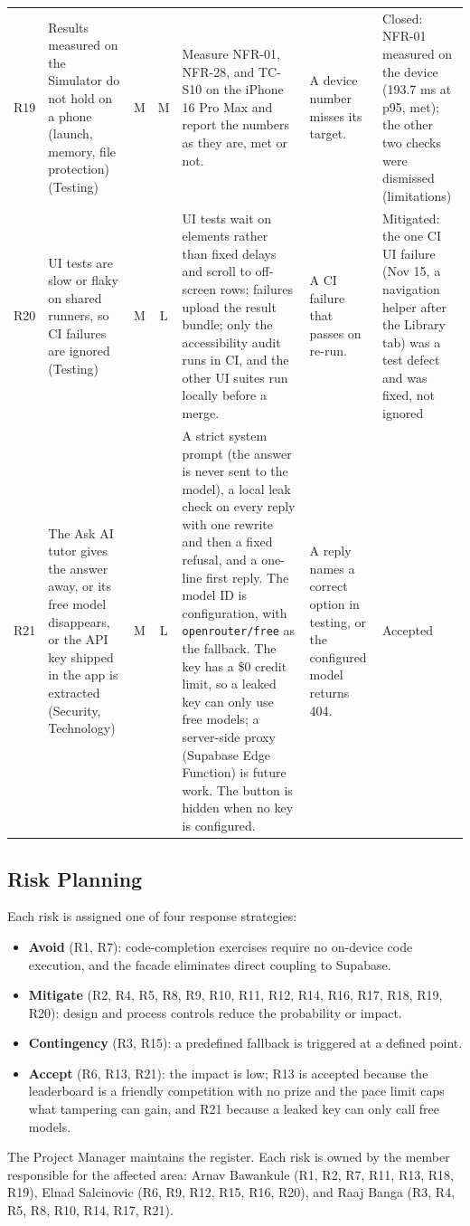 \documentclass[12pt,letterpaper]{article}
\begin{document}
\begin{xltabular}{\textwidth}{@{}l L{3.0cm} c c Y L{2.9cm} L{1.7cm}@{}}
R19 & Results measured on the Simulator do not hold on a phone (launch, memory, file protection) (Testing) & M & M & Measure NFR-01, NFR-28, and TC-S10 on the iPhone 16 Pro Max and report the numbers as they are, met or not. & A device number misses its target. & Closed: NFR-01 measured on the device (193.7 ms at p95, met); the other two checks were dismissed (limitations) \\
R20 & UI tests are slow or flaky on shared runners, so CI failures are ignored (Testing) & M & L & UI tests wait on elements rather than fixed delays and scroll to off-screen rows; failures upload the result bundle; only the accessibility audit runs in CI, and the other UI suites run locally before a merge. & A CI failure that passes on re-run. & Mitigated: the one CI UI failure (Nov 15, a navigation helper after the Library tab) was a test defect and was fixed, not ignored \\
R21 & The Ask AI tutor gives the answer away, or its free model disappears, or the API key shipped in the app is extracted (Security, Technology) & M & L & A strict system prompt (the answer is never sent to the model), a local leak check on every reply with one rewrite and then a fixed refusal, and a one-line first reply. The model ID is configuration, with \texttt{openrouter/free} as the fallback. The key has a \$0 credit limit, so a leaked key can only use free models; a server-side proxy (Supabase Edge Function) is future work. The button is hidden when no key is configured. & A reply names a correct option in testing, or the configured model returns 404. & Accepted \\
\end{xltabular}

\subsection{Risk Planning}
Each risk is assigned one of four response strategies:
\begin{itemize}
  \item \textbf{Avoid} (R1, R7): code-completion exercises require no on-device code
        execution, and the facade eliminates direct coupling to Supabase.
  \item \textbf{Mitigate} (R2, R4, R5, R8, R9, R10, R11, R12, R14, R16, R17, R18, R19,
        R20): design and process controls reduce the probability or impact.
  \item \textbf{Contingency} (R3, R15): a predefined fallback is triggered at a
        defined point.
  \item \textbf{Accept} (R6, R13, R21): the impact is low; R13 is accepted because the
        leaderboard is a friendly competition with no prize and the pace limit caps
        what tampering can gain, and R21 because a leaked key can only call free
        models.
\end{itemize}
The Project Manager maintains the register. Each risk is owned by the member
responsible for the affected area: Arnav Bawankule (R1, R2, R7, R11, R13, R18, R19), Elnad
Salcinovic (R6, R9, R12, R15, R16, R20), and Raaj Banga (R3, R4, R5, R8, R10, R14, R17, R21).
\end{document}
